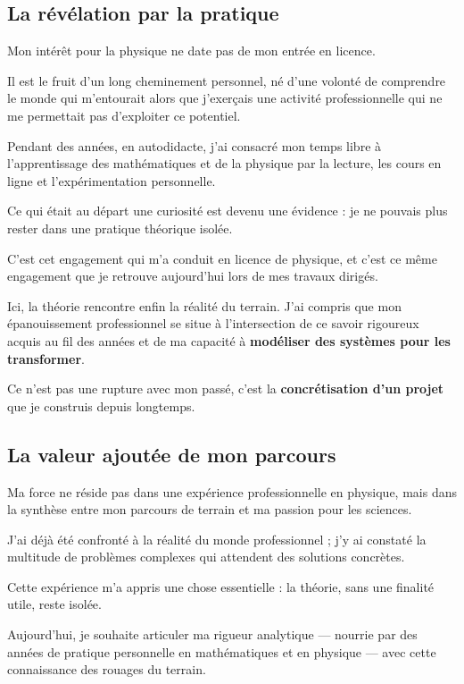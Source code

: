 \subsection{La révélation par la pratique}

Mon intérêt pour la physique ne date pas de mon entrée en licence. 

Il est le fruit d’un long cheminement personnel, 
né d’une volonté de comprendre le monde qui m'entourait 
alors que j'exerçais une activité professionnelle qui ne me permettait pas d'exploiter ce potentiel. 

Pendant des années, en autodidacte, 
j'ai consacré mon temps libre à l'apprentissage des mathématiques et de la physique 
par la lecture, les cours en ligne et l'expérimentation personnelle. 

Ce qui était au départ une curiosité est devenu une évidence : 
je ne pouvais plus rester dans une pratique théorique isolée.

C'est cet engagement qui m'a conduit en licence de physique, 
et c'est ce même engagement que je retrouve aujourd'hui lors de mes travaux dirigés. 

Ici, la théorie rencontre enfin la réalité du terrain. 
J'ai compris que mon épanouissement professionnel se situe à l'intersection 
de ce savoir rigoureux acquis au fil des années 
et de ma capacité à \textbf{modéliser des systèmes pour les transformer}. 

Ce n'est pas une rupture avec mon passé, 
c'est la \textbf{concrétisation d'un projet} que je construis depuis longtemps.

\subsection{La valeur ajoutée de mon parcours}

Ma force ne réside pas dans une expérience professionnelle en physique, 
mais dans la synthèse entre mon parcours de terrain 
et ma passion pour les sciences. 

J’ai déjà été confronté à la réalité du monde professionnel ; 
j'y ai constaté la multitude de problèmes complexes 
qui attendent des solutions concrètes.

Cette expérience m'a appris une chose essentielle : 
la théorie, sans une finalité utile, reste isolée. 

Aujourd'hui, 
je souhaite articuler ma rigueur analytique 
— nourrie par des années de pratique personnelle en mathématiques et en physique — 
avec cette connaissance des rouages du terrain. 

